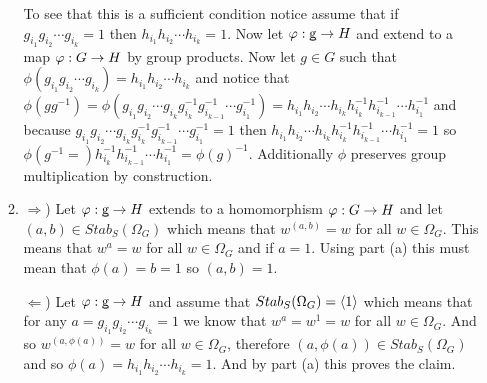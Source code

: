 \documentclass[12pt]{amsart}
\begin{document}
\begin{itemize}
\begin{enumerate}
      To see that this is a sufficient condition notice assume that if 
      $g_{i_1}g_{i_2}\cdots g_{i_k}=1$ then $h_{i_1}h_{i_2}\cdots h_{i_k}=1$. Now let $\varphi:\underbar{g}\rightarrow H$
      and extend to a map $\varphi: G\rightarrow H$ by group products. Now let $g\in G$ such that 
      $\phi(g_{i_1}g_{i_2}\cdots g_{i_k})=h_{i_1}h_{i_2}\cdots h_{i_k}$ and notice 
      that $\phi(gg^{-1})=\phi(g_{i_1}g_{i_2}\cdots g_{i_k}g^{-1}_{i_{k}}g^{-1}_{i_{k-1}}\cdots g^{-1}_{i_1})=h_{i_1}h_{i_2}\cdots h_{i_k}h^{-1}_{i_{k}}h^{-1}_{i_{k-1}}\cdots h^{-1}_{i_1}$
      and because $g_{i_1}g_{i_2}\cdots g_{i_k}g^{-1}_{i_{k}}g^{-1}_{i_{k-1}}\cdots g^{-1}_{i_1}=1$
      then $h_{i_1}h_{i_2}\cdots h_{i_k}h^{-1}_{i_{k}}h^{-1}_{i_{k-1}}\cdots h^{-1}_{i_1}=1$ so $\phi(g^{-1}=)h^{-1}_{i_{k}}h^{-1}_{i_{k-1}}\cdots h^{-1}_{i_1}=\phi(g)^{-1}$.
      Additionally $\phi$ preserves group multiplication by construction.
      
      \item $\Rightarrow$) Let $\varphi:\underbar{g}\rightarrow H$ extends to a homomorphism $\varphi:G\rightarrow H$
            and let $(a,b)\in Stab_S(\Omega_G)$ which means that $w^{(a,b)}=w$ for all $w\in\Omega_G$.
            This means that $w^a=w$ for all $w\in\Omega_G$ and if $a=1$.%
             Using part (a) this must mean
            that $\phi(a)=b=1$ so $(a,b)=1$.

            $\Leftarrow$) Let $\varphi:\underbar{g}\rightarrow H$ and assume that $Stab_S(\Omega_G)=\left\langle 1 \right\rangle$ 
            which means that for any $a=g_{i_1}g_{i_2}\cdots g_{i_k}=1$ we know that $w^a=w^1=w$ for all 
            $w\in\Omega_G$. And so $w^{(a,\phi(a))}=w$ for all $w\in \Omega_G$, therefore 
            $(a,\phi(a))\in Stab_S(\Omega_G)$ and so $\phi(a)=h_{i_1}h_{i_2}\cdots h_{i_k}=1$. And by part (a) this proves the claim.
   \end{enumerate}
\end{itemize}
\end{document}
